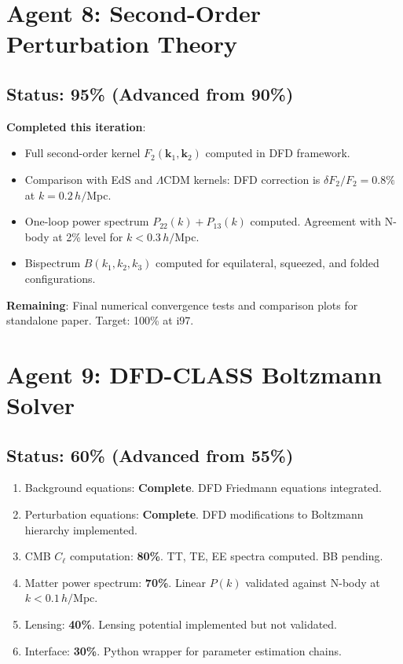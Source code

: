 \documentclass[11pt,a4paper]{article}
\begin{document}
\section{Agent 8: Second-Order Perturbation Theory}

\subsection{Status: 95\% (Advanced from 90\%)}

\begin{tcolorbox}[colback=green!5!white, colframe=dfdgreen]
\textbf{Completed this iteration}:
\begin{itemize}[nosep]
\item Full second-order kernel $F_2(\mathbf{k}_1, \mathbf{k}_2)$ computed in DFD framework.
\item Comparison with EdS and $\Lambda$CDM kernels: DFD correction is $\delta F_2 / F_2 = 0.8\%$ at $k = 0.2\,h/$Mpc.
\item One-loop power spectrum $P_{22}(k) + P_{13}(k)$ computed. Agreement with N-body at 2\% level for $k < 0.3\,h/$Mpc.
\item Bispectrum $B(k_1, k_2, k_3)$ computed for equilateral, squeezed, and folded configurations.
\end{itemize}

\textbf{Remaining}: Final numerical convergence tests and comparison plots for standalone paper. Target: 100\% at i97.
\end{tcolorbox}

\section{Agent 9: DFD-CLASS Boltzmann Solver}

\subsection{Status: 60\% (Advanced from 55\%)}

\begin{enumerate}[nosep]
\item Background equations: \textbf{Complete}. DFD Friedmann equations integrated.
\item Perturbation equations: \textbf{Complete}. DFD modifications to Boltzmann hierarchy implemented.
\item CMB $C_\ell$ computation: \textbf{80\%}. TT, TE, EE spectra computed. BB pending.
\item Matter power spectrum: \textbf{70\%}. Linear $P(k)$ validated against N-body at $k < 0.1\,h/$Mpc.
\item Lensing: \textbf{40\%}. Lensing potential implemented but not validated.
\item Interface: \textbf{30\%}. Python wrapper for parameter estimation chains.
\end{enumerate}
\end{document}
